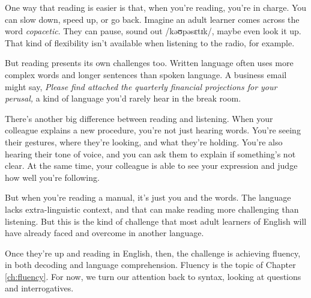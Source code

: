 One way that reading is easier is that, when you're reading, you're in charge. You can slow down, speed up, or go back. Imagine an adult learner comes across the word \textit{copacetic}. They can pause, sound out /kəʊpəsɛtɪk/, maybe even look it up. That kind of flexibility isn't available when listening to the radio, for example.

But reading presents its own challenges too. Written language often uses more complex words and longer sentences than spoken language. A business email might say, \textit{Please find attached the quarterly financial projections for your perusal,} a kind of language you'd rarely hear in the break room.

There's another big difference between reading and listening. When your colleague explains a new procedure, you're not just hearing words. You're seeing their gestures, where they're looking, and what they're holding. You're also hearing their tone of voice, and you can ask them to explain if something's not clear. At the same time, your colleague is able to see your expression and judge how well you're following.

But when you're reading a manual, it's just you and the words. The language lacks extra-linguistic context, and that can make reading more challenging than listening. But this is the kind of challenge that most adult learners of English will have already faced and overcome in another language.

Once they're up and reading in English, then, the challenge is achieving fluency, in both decoding and language comprehension. Fluency is the topic of Chapter \ref{ch:fluency}. For now, we turn our attention back to syntax, looking at questions and interrogatives.